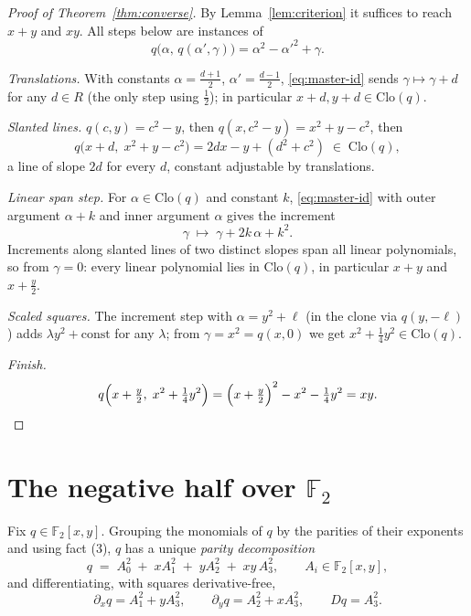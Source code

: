 \documentclass[11pt]{article}
\theoremstyle{definition}
\newcommand{\F}{\mathbb{F}}
\newcommand{\Clo}{\mathrm{Clo}}
\begin{document}
\begin{proof}[Proof of Theorem~\ref{thm:converse}]
By Lemma~\ref{lem:criterion} it suffices to reach $x+y$ and $xy$.
All steps below are instances of
\begin{equation}\label{eq:master-id}
  q\bigl(\alpha,\, q(\alpha', \gamma)\bigr)
  = \alpha^2 - \alpha'^2 + \gamma .
\end{equation}

\emph{Translations.}  With constants $\alpha = \frac{d+1}{2}$,
$\alpha' = \frac{d-1}{2}$, \eqref{eq:master-id} sends
$\gamma \mapsto \gamma + d$ for any $d \in R$ (the only step using
$\tfrac12$); in particular $x + d, y + d \in \Clo(q)$.

\emph{Slanted lines.}  $q(c, y) = c^2 - y$, then
$q(x, c^2 - y) = x^2 + y - c^2$, then
\[
  q\bigl(x + d,\; x^2 + y - c^2\bigr) = 2dx - y + (d^2 + c^2)
  \;\in\; \Clo(q),
\]
a line of slope $2d$ for every $d$, constant adjustable by
translations.

\emph{Linear span step.}  For $\alpha \in \Clo(q)$ and constant $k$,
\eqref{eq:master-id} with outer argument $\alpha + k$ and inner
argument $\alpha$ gives the increment
\[
  \gamma \;\longmapsto\; \gamma + 2k\,\alpha + k^2 .
\]
Increments along slanted lines of two distinct slopes span all
linear polynomials, so from $\gamma = 0$: every linear polynomial
lies in $\Clo(q)$, in particular $x + y$ and $x + \tfrac{y}{2}$.

\emph{Scaled squares.}  The increment step with $\alpha = y^2 + \ell$ (in the
clone via $q(y, -\ell)$) adds $\lambda y^2 + \text{const}$ for any
$\lambda$; from $\gamma = x^2 = q(x, 0)$ we get
$x^2 + \tfrac14 y^2 \in \Clo(q)$.

\emph{Finish.}
\[
  q\Bigl(x + \tfrac{y}{2},\; x^2 + \tfrac14 y^2\Bigr)
  = \Bigl(x + \tfrac{y}{2}\Bigr)^2 - x^2 - \tfrac14 y^2
  = xy . \qedhere
\]
\end{proof}

\section{The negative half over $\F_2$}\label{sec:negative}

Fix $q \in \F_2[x,y]$.  Grouping the monomials of $q$ by the
parities of their exponents and using fact (3), $q$ has a unique
\emph{parity decomposition}
\begin{equation}\label{eq:parity}
  q \;=\; A_0^2 \;+\; x A_1^2 \;+\; y A_2^2 \;+\; xy\,A_3^2,
  \qquad A_i \in \F_2[x,y],
\end{equation}
and differentiating, with squares derivative-free,
\begin{equation}\label{eq:partials}
  \partial_x q = A_1^2 + y A_3^2, \qquad
  \partial_y q = A_2^2 + x A_3^2, \qquad
  Dq = A_3^2 .
\end{equation}
\end{document}
